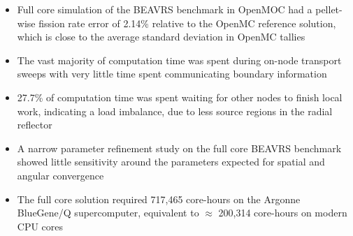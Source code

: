\vfill
\begin{highlightsbox}[frametitle=Highlights]
\begin{itemize}
  \item Full core simulation of the BEAVRS benchmark in OpenMOC had a pellet-wise fission rate error of 2.14\% relative to the OpenMC reference solution, which is close to the average standard deviation in OpenMC tallies
  
  \item The vast majority of computation time was spent during on-node transport sweeps with very little time spent communicating boundary information
  
  \item 27.7\% of computation time was spent waiting for other nodes to finish local work, indicating a load imbalance, due to less source regions in the radial reflector
  
  \item A narrow parameter refinement study on the full core BEAVRS benchmark showed little sensitivity around the parameters expected for spatial and angular convergence
  
  \item The full core solution required 717,465 core-hours on the Argonne BlueGene/Q supercomputer, equivalent to $\approx$ 200,314 core-hours on modern CPU cores
\end{itemize}
\end{highlightsbox}
\vfill
